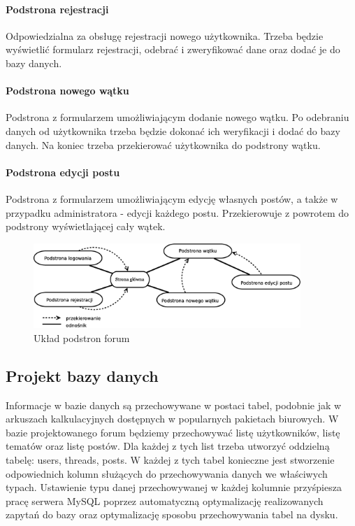 \documentclass[a4paper,10pt]{article}
\begin{document}
\paragraph{Podstrona rejestracji} Odpowiedzialna za obsługę rejestracji nowego użytkownika. Trzeba będzie wyświetlić formularz rejestracji, odebrać i zweryfikować dane oraz dodać je do bazy danych.

\paragraph{Podstrona nowego wątku} Podstrona z formularzem umożliwiającym dodanie nowego wątku. Po odebraniu danych od użytkownika trzeba będzie dokonać ich weryfikacji i dodać do bazy danych. Na koniec trzeba przekierować użytkownika do podstrony wątku.

\paragraph{Podstrona edycji postu} Podstrona z formularzem umożliwiającym edycję własnych postów, a także w przypadku administratora - edycji każdego postu. Przekierowuje z powrotem do podstrony wyświetlającej cały wątek. \\

\begin{figure}[htbp]
\centering
\includegraphics[width=0.9\textwidth]{subp.eps}
\caption{Układ podstron forum}
\end{figure}


\subsection{Projekt bazy danych}
Informacje w bazie danych są przechowywane w postaci tabel, podobnie jak w arkuszach kalkulacyjnych dostępnych w popularnych pakietach biurowych. W bazie projektowanego forum będziemy przechowywać listę użytkowników, listę tematów oraz listę postów. Dla każdej z tych list trzeba utworzyć oddzielną tabelę: users, threads, posts. W każdej z tych tabel konieczne jest stworzenie odpowiednich kolumn służących do przechowywania danych we właściwych typach. Ustawienie typu danej przechowywanej w każdej kolumnie przyśpiesza pracę serwera MySQL poprzez automatyczną optymalizację realizowanych zapytań do bazy oraz optymalizację sposobu przechowywania tabel na dysku.
\end{document}
